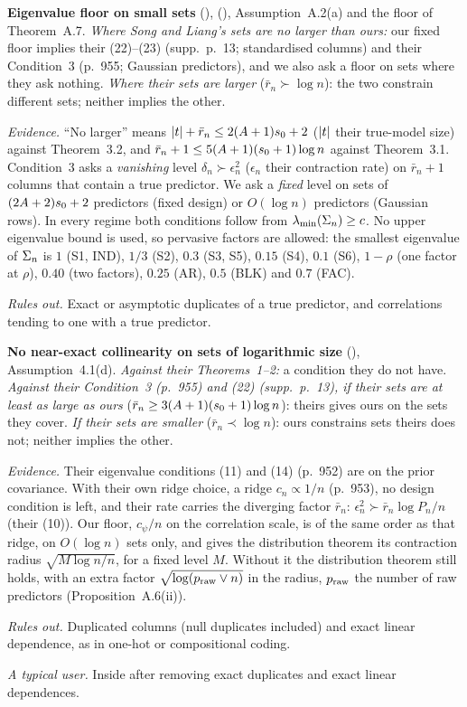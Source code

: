 \documentclass[11pt]{article}
\newcommand{\lab}[1]{\textup{(\asmdisp{#1})}}
\newcommand{\SL}{Song and Liang}
\newcommand{\ahead}[3]{\par\smallskip\noindent\textbf{#1} #2. #3\par}
\newcommand{\ev}[1]{\noindent\emph{Evidence.} #1\par}
\newcommand{\ro}[1]{\noindent\emph{Rules out.} #1\par}
\newcommand{\tu}[1]{\noindent\emph{A typical user.} #1\par}
\begin{document}
\ahead{Eigenvalue floor on small sets}{\lab{EF}, \lab{EFS}, Assumption~A.2(a) and the floor of Theorem~A.7}{\emph{Where \SL's sets are no larger than ours:} our fixed floor
implies their (22)--(23) (supp.\ p.~13; standardised columns) and their Condition~3 (p.~955; Gaussian predictors), and we
also ask a floor on sets where they ask nothing. \emph{Where their sets are larger} ($\bar r_n\succ\log n$): the two constrain different sets; neither implies
the other.}
\ev{``No larger'' means $\lvert t\rvert+\bar r_n\le2(A+1)s_0+2$ ($\lvert t\rvert$ their true-model size) against Theorem~3.2, and $\bar r_n+1\le5(A+1)(s_0+1)\log n$
against Theorem~3.1. Condition~3 asks a \emph{vanishing} level $\delta_n\succ\epsilon_n^2$ ($\epsilon_n$ their contraction rate) on $\bar r_n+1$ columns that contain a true
predictor. We ask
a \emph{fixed} level on sets of $(2A+2)s_0+2$ predictors (fixed design) or $O(\log n)$ predictors (Gaussian rows). In
every regime both conditions follow from $\lambda_{\min}(\Sigma_n)\ge c$. No upper eigenvalue bound is used, so pervasive factors are allowed: the smallest eigenvalue of
$\Sigma_n$ is $1$ (S1, IND), $1/3$ (S2), $0.3$ (S3, S5), $0.15$ (S4), $0.1$ (S6), $1-\rho$ (one factor at $\rho$), $0.40$ (two
factors), $0.25$ (AR), $0.5$ (BLK) and $0.7$ (FAC).}
\ro{Exact or asymptotic duplicates of a true predictor, and correlations tending to one with a true predictor.}

\ahead{No near-exact collinearity on sets of logarithmic size}{\lab{NC}, Assumption~4.1(d)}{\emph{Against their Theorems~1--2:} a condition they do not have. \emph{Against
their Condition~3 (p.~955) and (22) (supp.\ p.~13), if their sets are at least as large as ours}
($\bar r_n\ge3(A+1)(s_0+1)\log n$): theirs gives ours on the sets they cover. \emph{If their sets are smaller}
($\bar r_n\prec\log n$): ours constrains sets theirs does not; neither implies the other.}
\ev{Their eigenvalue conditions (11) and (14) (p.~952) are on the prior covariance. With their own ridge choice, a ridge
$c_n\propto1/n$ (p.~953), no design condition is left, and their rate carries the diverging factor $\bar r_n$:
$\epsilon_n^2\succ\bar r_n\log P_n/n$ (their (10)). Our floor, $c_\psi/n$
on the correlation scale, is of the same order as that ridge, on $O(\log n)$ sets only, and gives the distribution
theorem its contraction radius $\sqrt{M\log n/n}$, for a fixed level $M$. Without it the distribution theorem still
holds, with an extra factor $\sqrt{\log(p_{\mathrm{raw}}\vee n)}$ in the radius, $p_{\mathrm{raw}}$ the number of raw predictors (Proposition~A.6(ii)).}
\ro{Duplicated columns (null duplicates included) and exact linear dependence, as in one-hot or compositional coding.}
\tu{Inside after removing exact duplicates and exact linear dependences.}
\end{document}
